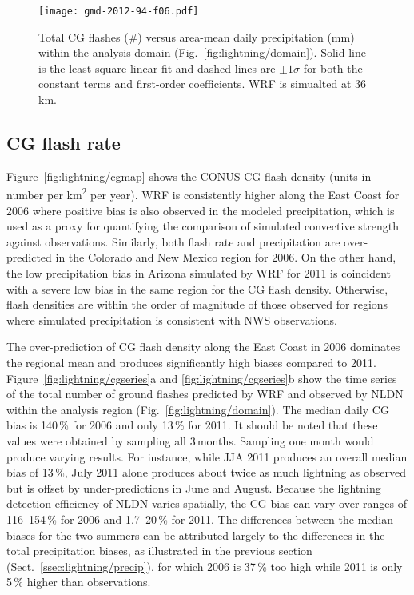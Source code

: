 \begin{figure}[t]
\texttt{[image: gmd-2012-94-f06.pdf]}
\caption[CG flashes vs. precipitation]{Total CG flashes (\#) versus area-mean daily precipitation
(\unit{mm}) within the analysis domain (Fig.~\ref{fig:lightning/domain}). Solid line is
the least-square linear fit and dashed lines are $\pm1\sigma$ for both the
constant terms and first-order coefficients. WRF is simualted at
36\,\unit{km}.}
      \label{fig:lightning/cgslope}
\end{figure}

\subsection{CG flash rate}\label{ssec:lightning/flashrate}

Figure~\ref{fig:lightning/cgmap} shows the CONUS CG flash density (units in number per
\unit{km^2} per year). WRF is consistently higher along the East Coast for
2006 where positive bias is also observed in the modeled precipitation, which
is used as a proxy for quantifying the comparison of simulated convective
strength against observations. Similarly, both flash rate and precipitation
are over-predicted in the Colorado and New Mexico region for 2006. On the
other hand, the low precipitation bias in Arizona simulated by WRF for 2011
is coincident with a severe low bias in the same region for the CG flash
density. Otherwise, flash densities are within the order of magnitude of
those observed for regions where simulated precipitation is consistent with
NWS observations.

The over-prediction of CG flash density along the East Coast in 2006
dominates the regional mean and produces significantly high biases compared
to 2011. Figure~\ref{fig:lightning/cgseries}a and \ref{fig:lightning/cgseries}b show the time
series of the total number of ground flashes predicted by WRF and observed by
NLDN within the analysis region (Fig.~\ref{fig:lightning/domain}). The median daily CG
bias is 140\,{\%} for 2006 and only 13\,{\%} for 2011. It should be noted
that these values were obtained by sampling all 3\,months. Sampling one month
would produce varying results. For instance, while JJA 2011 produces an
overall median bias of 13\,{\%}, July 2011 alone produces about twice as much
lightning as observed but is offset by under-predictions in June and August.
Because the lightning detection efficiency of NLDN varies spatially, the CG
bias can vary over ranges of 116--154\,{\%} for 2006 and 1.7--20\,{\%} for 2011.
The differences between the median biases for the two
summers can be attributed largely to the differences in the total
precipitation biases, as illustrated in the previous section
(Sect.~\ref{ssec:lightning/precip}), for which 2006 is 37\,{\%} too high while 2011 is
only 5\,{\%} higher than observations.


